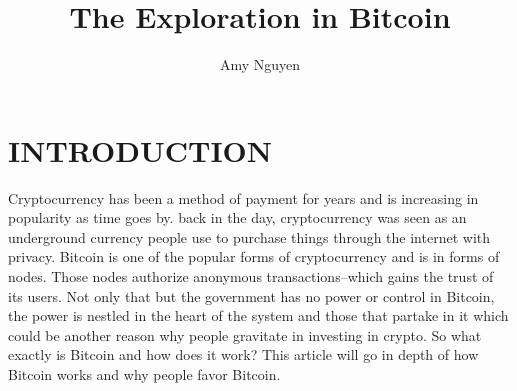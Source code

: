 \documentclass[letterpaper, 10 pt, conference]{ieeeconf}  %
\title{\LARGE \bf
The Exploration in Bitcoin 
}
\author{Amy Nguyen %

}
\begin{document}
\maketitle
\thispagestyle{empty}
\pagestyle{empty}




\section{INTRODUCTION}

Cryptocurrency has been a method of payment for years and is increasing in popularity as time goes by. back in the day, cryptocurrency was seen as an underground currency people use to purchase things through the internet with privacy. Bitcoin is one of the popular forms of cryptocurrency and is in forms of nodes. Those nodes authorize anonymous transactions--which gains the trust of its users. Not only that but the government has no power or control in Bitcoin, the power is nestled in the heart of the system and those that partake in it which could be another reason why people gravitate in investing in crypto. So what exactly is Bitcoin and how does it work? This article will go in depth of how Bitcoin works and why people favor Bitcoin.
\end{document}

